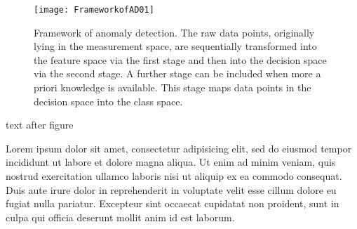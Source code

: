 \documentclass[10pt,a4paper,extrafontsizes,oldfontcommands,oneside]{memoir}
\begin{document}
\begin{figure}[!htbp]
\texttt{[image: FrameworkofAD01]} 
\caption{Framework of anomaly detection. The raw data points, originally lying
in the measurement space, are sequentially transformed into the feature
space via the first stage and then into the decision space via the
second stage. A further stage can be included when more a priori knowledge
is available. This stage maps data points in the decision space into
the class space.}
\label{fig:ADFramework2}
\end{figure}
text after figure

Lorem ipsum dolor sit amet, consectetur adipisicing elit, sed do eiusmod tempor incididunt ut labore et dolore magna aliqua. Ut enim ad minim veniam, quis nostrud exercitation ullamco laboris nisi ut aliquip ex ea commodo consequat. Duis aute irure dolor in reprehenderit in voluptate velit esse cillum dolore eu fugiat nulla pariatur. Excepteur sint occaecat cupidatat non proident, sunt in culpa qui officia deserunt mollit anim id est laborum.


% 

\end{document}
